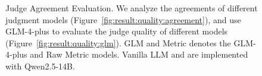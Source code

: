 \begin{figure}[t]
    \caption{Judge Agreement Evaluation. We analyze the agreements of different judgment models (Figure~\ref{fig:result:quality:agreement}), and use GLM-4-plus to evaluate the judge quality of different models (Figure~\ref{fig:result:quality:glm}). GLM and Metric denotes the GLM-4-plus and Raw Metric models. Vanilla LLM and \method{} are implemented with Qwen2.5-14B.}
    \label{fig:result:quality}
\end{figure}





